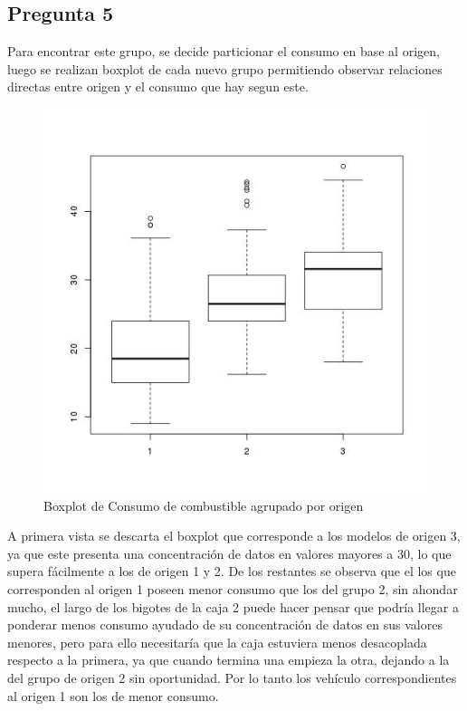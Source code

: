 \documentclass[letter,10pt]{article}
\begin{document}
\newpage
\subsection{Pregunta 5}

Para encontrar este grupo, se decide particionar el consumo en base al origen, luego se realizan boxplot de cada nuevo grupo
permitiendo observar relaciones directas entre origen y el consumo que hay segun este.
\begin{figure}[h!]
    \centering
    \includegraphics[scale=0.5]{boxplot_mpg_origin.jpg}
    \caption{Boxplot de Consumo de combustible agrupado por origen}
    \label{fig:boxplot_mpg_origin}
\end{figure}
A primera vista se descarta el boxplot que corresponde a los modelos de origen 3, ya que este presenta una concentración de datos en valores
mayores a 30, lo que supera fácilmente a los de origen 1 y 2.
De los restantes se observa que el los que corresponden al origen 1 poseen menor consumo que los del grupo 2, sin ahondar mucho,
el largo de los bigotes de la caja 2 puede hacer pensar que podría llegar a ponderar menos consumo ayudado de su concentración de datos
en sus valores menores, pero para ello necesitaría que la caja estuviera menos desacoplada respecto a la primera, ya que cuando termina una empieza la otra,
dejando a la del grupo de origen 2 sin oportunidad. Por lo tanto los vehículo correspondientes al origen 1 son los de menor consumo.
\end{document}
